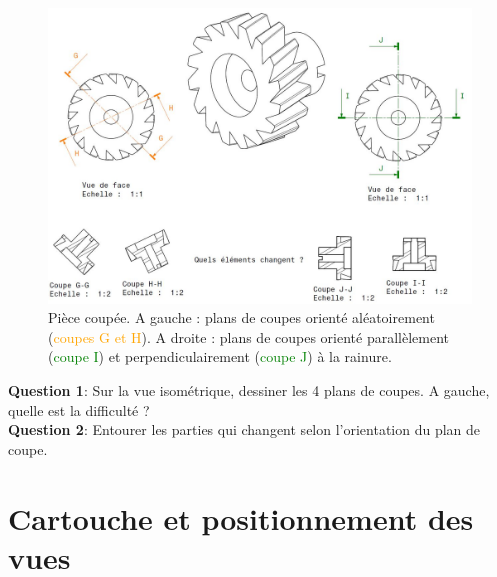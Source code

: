 \documentclass[
	11pt, %
	fleqn, %
	a4paper, %
]{LegrandOrangeBook}
\begin{document}
\begin{figure}[H] %
	\centering %
	\includegraphics[width=1\textwidth]{Images/orientation.JPG} %
	\caption{Pièce coupée. A gauche : plans de coupes orienté aléatoirement (\textcolor{Orange}{coupes G et H}). A droite : plans de coupes orienté parallèlement (\textcolor{Green}{coupe I}) et perpendiculairement (\textcolor{Green}{coupe J}) à la rainure.}
	\label{Orientation} %
\end{figure}


\begin{tcolorbox}[colback=gray!5!white,colframe=gray!75!ocre,title=Entrainement]

\textbf{Question 1}: Sur la vue isométrique, dessiner les 4 plans de coupes. A gauche, quelle est la difficulté ?\\

\textbf{Question 2}: Entourer les parties qui changent selon l'orientation du plan de coupe.

\end{tcolorbox}

\section{Cartouche et positionnement des vues}
\end{document}

